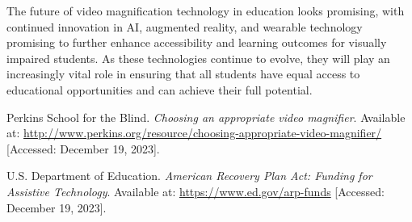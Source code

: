 The future of video magnification technology in education looks promising, with continued innovation in AI, augmented reality, and wearable technology promising to further enhance accessibility and learning outcomes for visually impaired students. As these technologies continue to evolve, they will play an increasingly vital role in ensuring that all students have equal access to educational opportunities and can achieve their full potential.

\begin{thebibliography}{99}

 Perkins School for the Blind. \textit{Choosing an appropriate video magnifier}. Available at: \url{http://www.perkins.org/resource/choosing-appropriate-video-magnifier/} [Accessed: December 19, 2023].

 U.S. Department of Education. \textit{American Recovery Plan Act: Funding for Assistive Technology}. Available at: \url{https://www.ed.gov/arp-funds} [Accessed: December 19, 2023].

\end{thebibliography}
